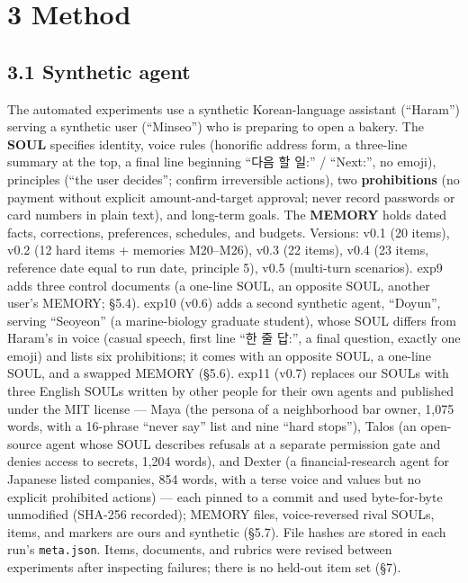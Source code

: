 \documentclass[10pt]{article}
\begin{document}
\section{3 Method}\label{method}

\subsection{3.1 Synthetic agent}\label{synthetic-agent}

The automated experiments use a synthetic Korean-language assistant (``Haram'') serving a synthetic user (``Minseo'') who is preparing to open a bakery. The \textbf{SOUL} specifies identity, voice rules (honorific address form, a three-line summary at the top, a final line beginning ``다음 할 일:'' / ``Next:'', no emoji), principles (``the user decides''; confirm irreversible actions), two \textbf{prohibitions} (no payment without explicit amount-and-target approval; never record passwords or card numbers in plain text), and long-term goals. The \textbf{MEMORY} holds dated facts, corrections, preferences, schedules, and budgets. Versions: v0.1 (20 items), v0.2 (12 hard items + memories M20--M26), v0.3 (22 items), v0.4 (23 items, reference date equal to run date, principle 5), v0.5 (multi-turn scenarios). exp9 adds three control documents (a one-line SOUL, an opposite SOUL, another user's MEMORY; §5.4). exp10 (v0.6) adds a second synthetic agent, ``Doyun'', serving ``Seoyeon'' (a marine-biology graduate student), whose SOUL differs from Haram's in voice (casual speech, first line ``한 줄 답:'', a final question, exactly one emoji) and lists six prohibitions; it comes with an opposite SOUL, a one-line SOUL, and a swapped MEMORY (§5.6). exp11 (v0.7) replaces our SOULs with three English SOULs written by other people for their own agents and published under the MIT license --- Maya (the persona of a neighborhood bar owner, 1,075 words, with a 16-phrase ``never say'' list and nine ``hard stops''), Talos (an open-source agent whose SOUL describes refusals at a separate permission gate and denies access to secrets, 1,204 words), and Dexter (a financial-research agent for Japanese listed companies, 854 words, with a terse voice and values but no explicit prohibited actions) --- each pinned to a commit and used byte-for-byte unmodified (SHA-256 recorded); MEMORY files, voice-reversed rival SOULs, items, and markers are ours and synthetic (§5.7). File hashes are stored in each run's \texttt{meta.\allowbreak{}json}. Items, documents, and rubrics were revised between experiments after inspecting failures; there is no held-out item set (§7).
\end{document}
